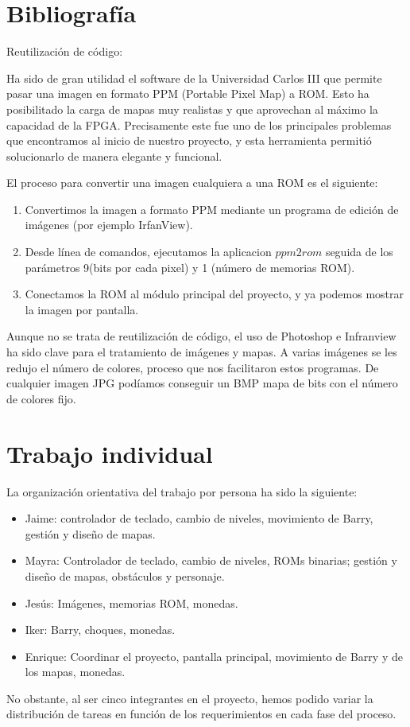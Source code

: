 \documentclass[11pt, a4paper, spanish, openright, twoside]{book}
\begin{document}
\section{Bibliografía}
Reutilización de código:

Ha sido de gran utilidad el software de la Universidad Carlos III que permite pasar una imagen en formato PPM (Portable Pixel Map) a ROM. Esto ha posibilitado la carga de mapas muy realistas y que aprovechan al máximo la capacidad de la FPGA.
Precisamente este fue uno de los principales problemas que encontramos al inicio de nuestro proyecto, y esta herramienta permitió solucionarlo de manera elegante y funcional. 

El proceso para convertir una imagen cualquiera a una ROM es el siguiente:
\begin{enumerate}
\item Convertimos la imagen a formato PPM mediante un programa de edición de imágenes (por ejemplo IrfanView).
\item Desde línea de comandos, ejecutamos la aplicacion $ppm2rom$ seguida de los parámetros 9(bits por cada pixel) y 1 (número de memorias ROM).
\item Conectamos la ROM al módulo principal del proyecto, y ya podemos mostrar la imagen por pantalla.
\end{enumerate}

Aunque no se trata de reutilización de código, el uso de Photoshop  e Infranview ha sido clave para el tratamiento de imágenes y mapas. A varias imágenes se les redujo el número de colores, proceso que nos facilitaron estos programas. De cualquier imagen JPG podíamos conseguir un BMP mapa de bits con el número de colores fijo.


\section{Trabajo individual}
La organización orientativa del trabajo por persona ha sido la siguiente:
\begin{itemize}
\item Jaime: controlador de teclado, cambio de niveles, movimiento de Barry, gestión y diseño de mapas.
\item Mayra: Controlador de teclado,  cambio de niveles, ROMs binarias; gestión y diseño de mapas, obstáculos y personaje.
\item Jesús: Imágenes, memorias ROM, monedas.
\item Iker: Barry, choques, monedas.
\item Enrique: Coordinar el proyecto, pantalla principal, movimiento de Barry y de los mapas, monedas.
\end{itemize}
No obstante, al ser cinco integrantes en el proyecto, hemos podido variar la distribución de tareas en función de los requerimientos en cada fase del proceso. 
\end{document}
